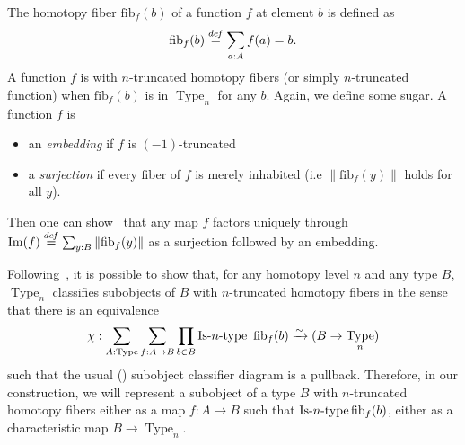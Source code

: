 \documentclass[preprint,9pt,numbers]{sigplanconf}
\newcommand \defeq {\overset{de\hspace{-0.2ex}f}{=}}
\DeclareMathOperator{\Type}{Type}
\DeclareMathOperator{\im}{Im}
\def\mymathhyphen{{\hbox{-}}}
\newcommand{\IsType}[1]
{\mathop{\mathrm{Is\mymathhyphen}#1\mathrm{\mymathhyphen type}} }
\newcommand \fib[2] {\mathrm{fib}_{#1}(#2)}
\newenvironment{mymath}[1][-0em]{%
  \newcommand\mymathaux{\vspace{#1}}%
  \vspace{#1}%
  \begin{equation*}%
  }{ %
    \mymathaux%
  \end{equation*}}
\begin{document}
%
The homotopy fiber $\fib{f}{b}$ of a function $f$ at element $b$ is
defined as 
\begin{mymath}[-0.3em]
\fib{f}{b} \defeq \sum_{a:A} f(a) = b.
\end{mymath}%
%
A function $f$ is with $n$-truncated homotopy fibers (or simply
$n$-truncated function) when $\fib{f}{b}$
is in $\Type_n$ for any $b$.  
%
Again, we define some sugar. A function $f$ is 
\begin{itemize}
\item an {\em embedding} if $f$ is $(-1)$-truncated
\item a {\em surjection} if every fiber of $f$ is merely inhabited
  (i.e $\|\fib f y\|$ holds for all $y$).
\end{itemize}
Then one can show~\cite[Lemma 7.6.4]{hottbook} that any map $f$
factors uniquely through $\im(f) \defeq \sum_{y:B} \|\fib f y\|$ as a
surjection followed by an embedding.

Following~\cite{sets_in_hott}, it is possible to show that, for any
homotopy level $n$ and any type $B$, $\Type_n$ classifies subobjects
of $B$ with $n$-truncated homotopy fibers in the sense that there is
an equivalence
%
\begin{mymath}[0em]
  \chi : \sum_{A:\Type} \sum_{f:A \to B} \prod_{b\in B}
\IsType n\
\fib{f}{b} \xrightarrow{\sim} 
 (B \to \Type_n)
\end{mymath}%
%
 such that the usual (\cite[Theorem 4.8.4]{hottbook}) subobject
 classifier diagram is a pullback.
Therefore, in our construction, we will represent a subobject of a
type $B$ with $n$-truncated homotopy fibers either as a map $f:A\to B$
such that $\IsType n \fib{f}{b}$, either as a characteristic map $B\to \Type_n$.
\end{document}
